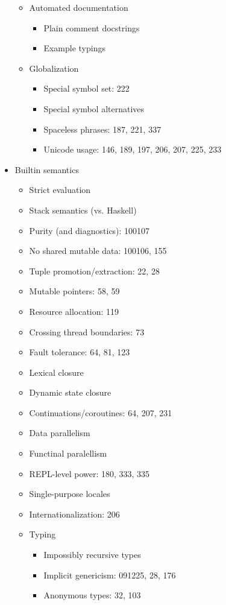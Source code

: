 \begin{itemize}
\begin{itemize}
  \item Automated documentation
    \begin{itemize}
    \item Plain comment docstrings
    \item Example typings
    \end{itemize}
  \item Globalization
    \begin{itemize}
    \item Special symbol set: 222
    \item Special symbol alternatives
    \item Spaceless phrases: 187, 221, 337
    \item Unicode usage: 146, 189, 197, 206, 207, 225, 233
    \end{itemize}
  \end{itemize}
\item Builtin semantics
  \begin{itemize}
  \item Strict evaluation
  \item Stack semantics (vs. Haskell)
  \item Purity (and diagnostics): 100107
  \item No shared mutable data: 100106, 155
  \item Tuple promotion/extraction: 22, 28
  \item Mutable pointers: 58, 59
  \item Resource allocation: 119
  \item Crossing thread boundaries: 73
  \item Fault tolerance: 64, 81, 123
  \item Lexical closure
  \item Dynamic state closure
  \item Continuations/coroutines: 64, 207, 231
  \item Data parallelism
  \item Functinal paralellism
  \item REPL-level power: 180, 333, 335
  \item Single-purpose locales
  \item Internationalization: 206
  \item Typing
    \begin{itemize}
    \item Impossibly recursive types
    \item Implicit genericism: 091225, 28, 176
    \item Anonymous types: 32, 103

\end{itemize}
\end{itemize}
\end{itemize}
